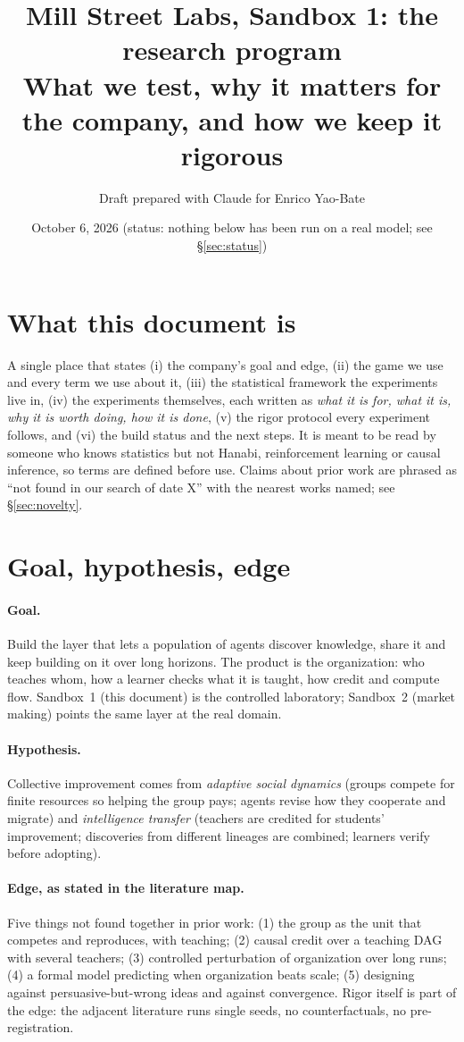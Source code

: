 \documentclass[11pt]{article}
\title{Mill Street Labs, Sandbox 1: the research program\\[2pt]
\large What we test, why it matters for the company, and how we keep it rigorous}
\author{Draft prepared with Claude for Enrico Yao-Bate}
\date{October 6, 2026 (status: nothing below has been run on a real model; see \S\ref{sec:status})}
\begin{document}
\maketitle

\section{What this document is}

A single place that states (i) the company's goal and edge, (ii) the game we use and every term we use about it,
(iii) the statistical framework the experiments live in, (iv) the experiments themselves, each written as
\emph{what it is for, what it is, why it is worth doing, how it is done}, (v) the rigor protocol every experiment
follows, and (vi) the build status and the next steps. It is meant to be read by someone who knows statistics but
not Hanabi, reinforcement learning or causal inference, so terms are defined before use. Claims about prior work are
phrased as ``not found in our search of date X'' with the nearest works named; see \S\ref{sec:novelty}.

\section{Goal, hypothesis, edge}\label{sec:goal}

\paragraph{Goal.} Build the layer that lets a population of agents discover knowledge, share it and keep building on
it over long horizons. The product is the organization: who teaches whom, how a learner checks what it is taught, how
credit and compute flow. Sandbox~1 (this document) is the controlled laboratory; Sandbox~2 (market making) points the
same layer at the real domain.

\paragraph{Hypothesis.} Collective improvement comes from \emph{adaptive social dynamics} (groups compete for finite
resources so helping the group pays; agents revise how they cooperate and migrate) and \emph{intelligence transfer}
(teachers are credited for students' improvement; discoveries from different lineages are combined; learners verify
before adopting).

\paragraph{Edge, as stated in the literature map.} Five things not found together in prior work: (1) the group as
the unit that competes and reproduces, with teaching; (2) causal credit over a teaching DAG with several teachers;
(3) controlled perturbation of organization over long runs; (4) a formal model predicting when organization beats
scale; (5) designing against persuasive-but-wrong ideas and against convergence. Rigor itself is part of the edge:
the adjacent literature runs single seeds, no counterfactuals, no pre-registration.
\end{document}
